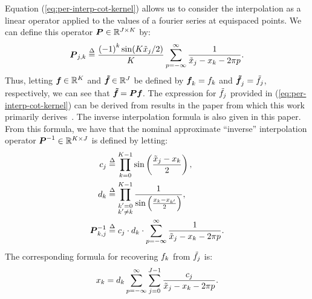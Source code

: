 Equation (\ref{eq:per-interp-cot-kernel}) allows us to consider the
interpolation as a linear operator applied to the values of a fourier
series at equispaced points. We can define this operator
$\boldsymbol{P}\in\mathbb{R}^{J\times K}$ by:
\begin{align}
  \label{eq:interp-operator}
  \boldsymbol{P}_{j,k} \overset{\Delta}{=} \frac{{(-1)}^k \sin(K{\tilde{x}}_{j}/2)}{K} \sum_{p=-\infty}^\infty \frac{1}{{\tilde{x}}_{j} - {x}_{k} - 2\pi p}.
\end{align}
Thus, letting $\boldsymbol{{f}_{}}\in\mathbb{R}^K$ and
$\boldsymbol{{\tilde{f}}_{}}\in\mathbb{R}^J$ be defined by
$\boldsymbol{{f}_{}}_k = {f}_{k}$ and
$\boldsymbol{{\tilde{f}}_{}}_j = {\tilde{f}}_{j}$, respectively, we can
see that $\boldsymbol{{\tilde{f}}_{}} = \boldsymbol{P}\boldsymbol{{f}_{}}$. The expression for
${\tilde{f}}_{j{}}$ provided in (\ref{eq:per-interp-cot-kernel})
can be derived from results in the paper from which this work
primarily derives~\cite{Dutt95fastfourierII}. The inverse
interpolation formula is also given in this paper. From this formula,
we have that the nominal approximate ``inverse'' interpolation
operator $\boldsymbol{P}^{-1}\in\mathbb{R}^{K\times J}$ is defined
by letting:
\begin{align}
  c_{j} &\overset{\Delta}{=} \prod_{k=0}^{K-1} \sin\left(\frac{{\tilde{x}}_{j}-{x}_{k}}{2}\right), \label{eq:cjs} \\
  d_{k} &\overset{\Delta}{=} \prod_{\substack{k'=0 \\ k'\neq k}}^{K-1} \frac{1}{\sin\left(\frac{{x}_{k} - {x}_{k{}'}}{2}\right)}, \label{eq:dks} \\
  \boldsymbol{P}^{-1}_{k,j} &\overset{\Delta}{=} c_{j}\cdot d_{k}\cdot\sum_{p=-\infty}^\infty \frac{1}{{\tilde{x}}_{j} - {x}_{k} - 2\pi p}. \label{eq:inverse-interp-operator}
\end{align}
The corresponding formula for recovering ${f}_{k}$ from
${\tilde{f}}_{j}$ is:
\begin{align}\label{eq:per-inv-interp-cot-kernel}
  {x}_{k} = d_{k} \sum_{p=-\infty}^\infty\sum_{j=0}^{J-1}\frac{c_{j}}{{\tilde{x}}_{j} - {x}_{k} - 2\pi p}.
\end{align}

